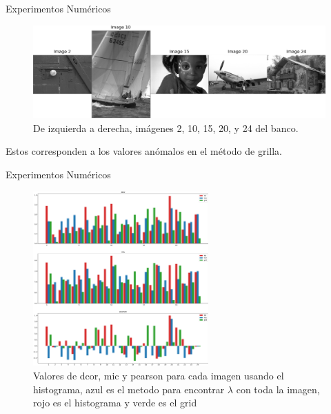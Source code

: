 \documentclass{beamer}
\begin{document}
\begin{frame}{Experimentos Numéricos}
    \begin{figure}[H]
        \centering
        \includegraphics[width=\textwidth]{anomalies_grid.png}
        \caption{De izquierda a derecha, im\'agenes 2, 10, 15, 20, y 24 del banco.}
    \end{figure}
    Estos corresponden a los valores an\'omalos en el m\'etodo de grilla.
\end{frame}


\begin{frame}{Experimentos Numéricos}
    \begin{figure}[H]
        \centering
        \includegraphics[width=0.6\textwidth]{plot_comparison_hist.png}
        \caption{Valores de dcor, mic y pearson para cada imagen usando el histograma, azul es el metodo para encontrar $\lambda$ con toda la imagen, rojo es el histograma y verde es el grid}
    \end{figure}
\end{frame}
\end{document}

